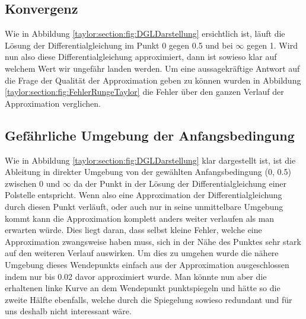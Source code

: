 \subsection{Konvergenz
\label{taylor:subsection:Konvergenz}}
%
Wie in Abbildung 
\ref{taylor:section:fig:DGLDarstellung}
ersichtlich ist, läuft die Lösung der Differentialgleichung im Punkt 0 gegen 0.5 und bei $\infty$ gegen 1.
Wird nun also diese Differentialgleichung approximiert, dann ist sowieso klar auf welchem Wert wir ungefähr landen werden.
Um eine aussagekräftige Antwort auf die Frage der Qualität der Approximation geben zu können wurden in Abbildung \ref{taylor:section:fig:FehlerRungeTaylor} die Fehler über den ganzen Verlauf der Approximation verglichen.


\subsection{Gefährliche Umgebung der Anfangsbedingung
\label{taylor:subsection:0Punkt}}
Wie in Abbildung 
\ref{taylor:section:fig:DGLDarstellung}
klar dargestellt ist, ist die Ableitung in direkter Umgebung von der gewählten Anfangsbedingung (0, 0.5) zwischen 0 und $\infty$ da der Punkt in der Lösung der Differentialgleichung einer Polstelle entspricht.
Wenn also eine Approximation der Differentialgleichung durch diesen Punkt verläuft, oder auch nur in seine unmittelbare Umgebung kommt kann die Approximation komplett anders weiter verlaufen als man erwarten würde.
Dies liegt daran, dass selbst kleine Fehler, welche eine Approximation zwangsweise haben muss, sich in der Nähe des Punktes sehr stark auf den weiteren Verlauf auswirken.
Um dies zu umgehen wurde die nähere Umgebung dieses Wendepunkts einfach aus der Approximation ausgeschlossen indem nur bis 0.02 davor approximiert wurde.
Man könnte nun aber die erhaltenen linke Kurve an dem Wendepunkt punktspiegeln und hätte so die zweite Hälfte ebenfalls, welche durch die Spiegelung sowieso redundant und für uns deshalb nicht interessant wäre.



